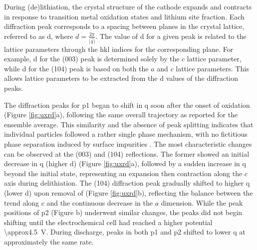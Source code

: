 \documentclass{article}
\begin{document}
During (de)lithiation, the crystal structure of the cathode expands
and contracts in response to transition metal oxidation states and
lithium site fraction. Each diffraction peak corresponds to a spacing
between planes in the crystal lattice, referred to as \gls{d}, where
$d=\frac{2\pi}{\vert\vec{q}\vert}$. The value of \gls{d} for a given
peak is related to the lattice parameters through the hkl indices for
the corresponding plane. For example, \gls{d} for the (003) peak is
determined solely by the $c$ lattice parameter, while \gls{d} for the
(104) peak is based on both the $a$ and $c$ lattice parameters. This
allows lattice parameters to be extracted from the \gls{d} values of
the diffraction peaks.

The diffraction peaks for \gls{p1} began to shift in \gls{q} soon
after the onset of oxidation (Figure \ref{fig:uxrd}a), following the
same overall trajectory as reported for the ensemble
average\cite{robert2015}. This similarity and the absence of peak
splitting indicates that individual particles followed a rather single
phase mechanism, with no fictitious phase separation induced by
surface impurities \cite{grenier2017}. The most characteristic changes
can be observed at the (003) and (104) reflections. The former showed
an initial decrease in \gls{q} (higher \gls{d}) (Figure
\ref{fig:uxrd}a), followed by a sudden increase in \gls{q} beyond the
initial state, representing an expansion then contraction along the
$c$ axis during delithiation\citeme{}. The (104) diffraction peak
gradually shifted to higher \gls{q} (lower \gls{d}) upon removal of
 (Figure \ref{fig:uxrd}b), reflecting the balance between the
trend along $c$ and the continuous decrease in the $a$
dimension.\cite{robert2015} While the peak positions of \gls{p2}
(Figure b) underwent similar changes, the peaks
did not begin shifting until the electrochemical cell had reached a
higher potential \SI{\approx4.5}{\volt}. During discharge, peaks in
both \gls{p1} and \gls{p2} shifted to lower \gls{q} at approximately
the same rate.
\end{document}

